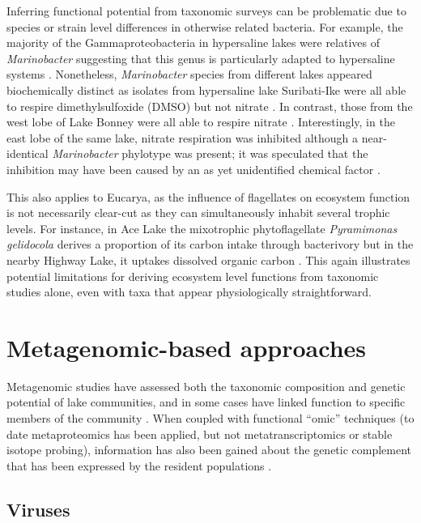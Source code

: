 \documentclass{book}
\begin{document}
Inferring functional potential from taxonomic surveys can be problematic due to species or strain level differences in otherwise related bacteria.
For example, the majority of the Gammaproteobacteria in hypersaline lakes were relatives of \textit{Marinobacter} suggesting that this genus is particularly adapted to hypersaline systems
\cite{Bowman2000b, Glatz2006, Matsuzaki2006, Mosier2007}.
Nonetheless, \textit{Marinobacter} species from different lakes appeared biochemically distinct
 as isolates from hypersaline lake Suribati-Ike were all able to respire dimethylsulfoxide (DMSO) but not nitrate \cite{Matsuzaki2006}. 
In contrast, those from the west lobe of Lake Bonney were all able to respire nitrate \cite{Ward1997}. 
Interestingly, in the east lobe of the same lake, nitrate respiration was inhibited although a near-identical \textit{Marinobacter} phylotype was present; 
it was speculated that the inhibition may have been caused by an as yet unidentified chemical factor \cite{Ward2005, Glatz2006}. 

This also applies to Eucarya, as the influence of flagellates on ecosystem function is not necessarily clear-cut as they can simultaneously inhabit several trophic levels. 
For instance, in Ace Lake the mixotrophic phytoflagellate \textit{Pyramimonas gelidocola} derives a proportion of its carbon intake through bacterivory \cite{Bell2003} 
but in the nearby Highway Lake, it uptakes dissolved organic carbon \cite{Laybourn-Parry2005}. 
This again illustrates potential limitations for deriving ecosystem level functions from taxonomic studies alone, even with taxa that appear physiologically straightforward. 

\section{Metagenomic-based approaches}
Metagenomic studies have assessed both the taxonomic composition and genetic potential of lake communities, and in some cases have linked function to specific members of the community 
\cite{Lopez-Bueno2009, Ng2010, Lauro2011, Yau2011, Varin2012}.%
When coupled with functional ``omic'' techniques (to date metaproteomics has been applied, but not metatranscriptomics or stable isotope probing), 
information has also been gained about the genetic complement that has been expressed by the resident populations \cite{Ng2010 Lauro2011, Yau2011}.
\subsection{Viruses}
\end{document}
